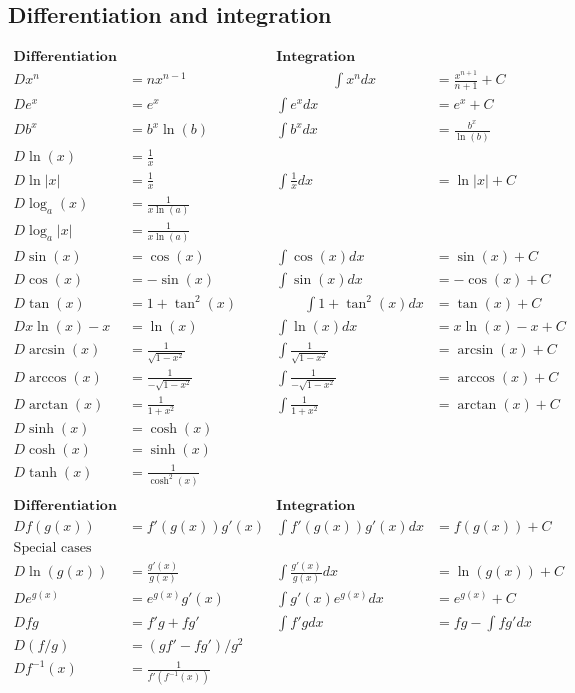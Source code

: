 \documentclass[12pt]{article}
\begin{document}
\subsection*{Differentiation and integration}

$$
\begin{array}{rl|rl}
\textbf{Differentiation} && \textbf{Integration}&\\[2mm]
Dx^n&=nx^{n-1}     \qquad\qquad&\qquad\qquad\int x^ndx&=\frac{x^{n+1}}{n+1}+C \\[2mm]
De^x&=e^x &\int e^xdx&=e^x+C\\[2mm]
Db^x&=b^x\ln(b) & \int b^xdx&=\frac{b^x}{\ln(b)}\\[2mm]
D\ln(x)&=\frac{1}{x} &&\\[2mm]
D\ln|x|&=\frac{1}{x} &\int\frac{1}{x}dx&=\ln|x|+C\\[2mm]
D\log_a(x)&=\frac{1}{x\ln(a)} &&\\[2mm]
D\log_a|x|&=\frac{1}{x\ln(a)} &&\\[2mm]
D\sin(x)&=\cos(x)   &\int\cos(x)dx&=\sin(x)+C\\[2mm]
D\cos(x)&=-\sin(x)  &\int\sin(x)dx&=-\cos(x)+C\\[2mm]
D\tan(x)&=1+\tan^2(x) \qquad&\qquad\int 1+\tan^2(x)dx&=\tan(x)+C\\[2mm]

Dx\ln(x)-x&=\ln(x) & \int\ln(x)dx&=x\ln(x)-x+C\\[10mm]

D\arcsin(x)&=\frac{1}{\sqrt{1-x^2}} & \int\frac{1}{\sqrt{1-x^2}}&=\arcsin(x)+C\\
D\arccos(x)&=\frac{1}{-\sqrt{1-x^2}} & \int\frac{1}{-\sqrt{1-x^2}}&=\arccos(x)+C\\
D\arctan(x)&=\frac{1}{1+x^2} & \int\frac{1}{1+x^2}&=\arctan(x)+C\\

D\sinh(x)&=\cosh(x) &&\\
D\cosh(x)&=\sinh(x) &&\\
D\tanh(x)&=\frac{1}{\cosh^2(x)} &&\\
\end{array}  
$$
\vspace{1cm}
$$
\begin{array}{rl|rl}
\textbf{Differentiation} && \textbf{Integration}&\\[2mm]
D f(g(x))&=f'(g(x))g'(x) & \int f'(g(x))g'(x)dx&=f(g(x))+C\\[2mm]
\textrm{Special cases} &&&\\
D\ln(g(x))&=\frac{g'(x)}{g(x)} & \int \frac{g'(x)}{g(x)}dx&=\ln(g(x))+C\\[2mm]
D e^{g(x)}&=e^{g(x)}g'(x) & \int g'(x)e^{g(x)}dx&=e^{g(x)}+C\\[10mm]
D fg&=f'g+fg'& \int f'g dx&=fg-\int fg'dx\\[2mm]
D (f/g)&=(gf'-fg')/g^2 &&\\[2mm]
D f^{-1}(x)&=\frac{1}{f'(f^{-1}(x))}&&\\
\end{array}  
$$
\end{document}
